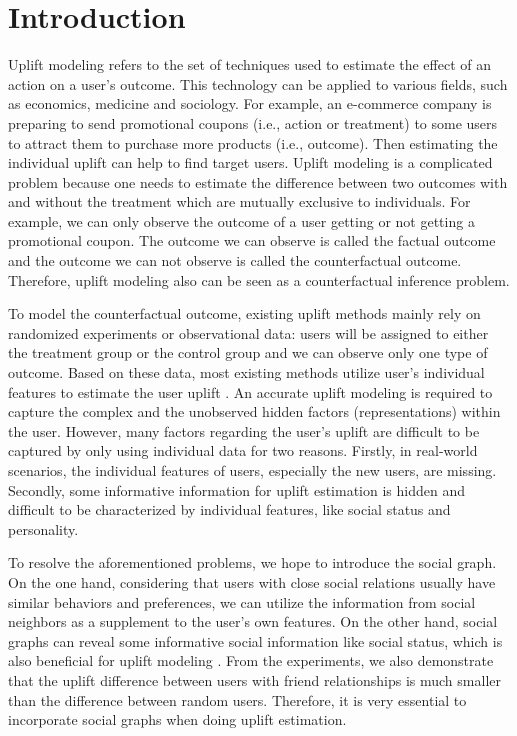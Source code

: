 \section{Introduction}
Uplift modeling refers to the set of techniques used to estimate the effect of an action on a user's outcome. This technology can be applied to various fields, such as economics\cite{olaya2020survey,gubela2017revenue}, medicine\cite{jaroszewicz2014uplift,jaskowski2012uplift} and sociology\cite{olaya2020uplift,guo2020counterfactual}. For example, an e-commerce company is preparing to send promotional coupons (i.e., action or treatment) to some users to attract them to purchase more products (i.e., outcome). Then estimating the individual uplift can help to find target users. Uplift modeling is a complicated problem because one needs to estimate the difference between two outcomes with and without the treatment which are mutually exclusive to individuals. For example, we can only observe the outcome of a user getting or not getting a promotional coupon. The outcome we can observe is called the factual outcome and the outcome we can not observe is called the counterfactual outcome. Therefore, uplift modeling also can be seen as a counterfactual inference problem\cite{gutierrez2017causal,kuang2020data}. 

To model the counterfactual outcome, existing uplift methods mainly rely on randomized experiments or observational data: users will be assigned to either the treatment group or the control group and we can observe only one type of outcome. Based on these data, most existing methods \cite{gutierrez2017causal,guelman2015uplift,rzepakowski2012decision} utilize user's individual features to estimate the user uplift \cite{breiman2001random,chen2016xgboost}. An accurate uplift modeling is required to capture the complex and the unobserved hidden factors (representations) within the user. However, many factors regarding the user's uplift are difficult to be captured by only using individual data for two reasons. Firstly, in real-world scenarios, the individual features of users, especially the new users, are missing. Secondly, some informative information for uplift estimation is hidden and difficult to be characterized by individual features, like social status and personality.

To resolve the aforementioned problems, we hope to introduce the social graph. On the one hand, considering that users with close social relations usually have similar behaviors and preferences, we can utilize the information from social neighbors as a supplement to the user's own features. On the other hand, social graphs can reveal some informative social information like social status, which is also beneficial for uplift modeling \cite{veitch2019using}. From the experiments, we also demonstrate that the uplift difference between users with friend relationships is much smaller than the difference between random users. Therefore, it is very essential to incorporate social graphs when doing uplift estimation. 

